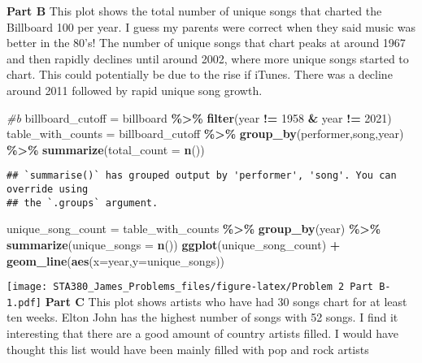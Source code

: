 \documentclass[
]{article}
\newenvironment{Shaded}{\begin{snugshade}}{\end{snugshade}}
\newcommand{\AttributeTok}[1]{\textcolor[rgb]{0.13,0.29,0.53}{#1}}
\newcommand{\CommentTok}[1]{\textcolor[rgb]{0.56,0.35,0.01}{\textit{#1}}}
\newcommand{\DecValTok}[1]{\textcolor[rgb]{0.00,0.00,0.81}{#1}}
\newcommand{\FunctionTok}[1]{\textcolor[rgb]{0.13,0.29,0.53}{\textbf{#1}}}
\newcommand{\NormalTok}[1]{#1}
\newcommand{\OtherTok}[1]{\textcolor[rgb]{0.56,0.35,0.01}{#1}}
\newcommand{\SpecialCharTok}[1]{\textcolor[rgb]{0.81,0.36,0.00}{\textbf{#1}}}
\begin{document}
\textbf{Part B} This plot shows the total number of unique songs that
charted the Billboard 100 per year. I guess my parents were correct when
they said music was better in the 80's! The number of unique songs that
chart peaks at around 1967 and then rapidly declines until around 2002,
where more unique songs started to chart. This could potentially be due
to the rise if iTunes. There was a decline around 2011 followed by rapid
unique song growth.

\begin{Shaded}
\begin{Highlighting}[]
\CommentTok{\#b}
\NormalTok{billboard\_cutoff }\OtherTok{=}\NormalTok{ billboard }\SpecialCharTok{\%\textgreater{}\%} \FunctionTok{filter}\NormalTok{(year }\SpecialCharTok{!=} \DecValTok{1958} \SpecialCharTok{\&}\NormalTok{ year }\SpecialCharTok{!=} \DecValTok{2021}\NormalTok{)}
\NormalTok{table\_with\_counts }\OtherTok{=}\NormalTok{ billboard\_cutoff }\SpecialCharTok{\%\textgreater{}\%} \FunctionTok{group\_by}\NormalTok{(performer,song,year) }\SpecialCharTok{\%\textgreater{}\%} 
  \FunctionTok{summarize}\NormalTok{(}\AttributeTok{total\_count =} \FunctionTok{n}\NormalTok{())}
\end{Highlighting}
\end{Shaded}

\begin{verbatim}
## `summarise()` has grouped output by 'performer', 'song'. You can override using
## the `.groups` argument.
\end{verbatim}

\begin{Shaded}
\begin{Highlighting}[]
\NormalTok{unique\_song\_count }\OtherTok{=}\NormalTok{ table\_with\_counts }\SpecialCharTok{\%\textgreater{}\%} \FunctionTok{group\_by}\NormalTok{(year) }\SpecialCharTok{\%\textgreater{}\%} 
  \FunctionTok{summarize}\NormalTok{(}\AttributeTok{unique\_songs =} \FunctionTok{n}\NormalTok{())}
\FunctionTok{ggplot}\NormalTok{(unique\_song\_count) }\SpecialCharTok{+} \FunctionTok{geom\_line}\NormalTok{(}\FunctionTok{aes}\NormalTok{(}\AttributeTok{x=}\NormalTok{year,}\AttributeTok{y=}\NormalTok{unique\_songs))}
\end{Highlighting}
\end{Shaded}

\texttt{[image: STA380\_James\_Problems\_files/figure-latex/Problem 2 Part B-1.pdf]}
\textbf{Part C} This plot shows artists who have had 30 songs chart for
at least ten weeks. Elton John has the highest number of songs with 52
songs. I find it interesting that there are a good amount of country
artists filled. I would have thought this list would have been mainly
filled with pop and rock artists
\end{document}
